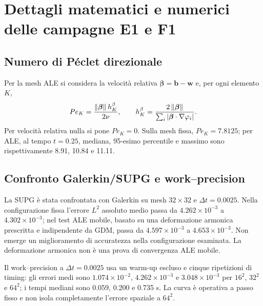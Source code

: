 \section{Dettagli matematici e numerici delle campagne E1 e F1}
\label{app:stageef}\label{app:solver_supplement}

\subsection{Numero di Péclet direzionale}

Per la mesh ALE si considera la velocità relativa $\boldsymbol\beta=\bm b-\bm w$ e, per ogni elemento $K$,
\begin{equation}
Pe_K=\frac{\left\lVert \boldsymbol\beta \right\rVert h_K^\beta}{2\nu},\qquad
h_K^\beta=\frac{2\left\lVert \boldsymbol\beta \right\rVert}{\sum_i|\boldsymbol\beta\cdot\nabla\varphi_i|}.
\label{eq:peclet_local}
\end{equation}
Per velocità relativa nulla si pone $Pe_K=0$. Sulla mesh fissa, $Pe_K=7.8125$; per ALE, al tempo $t=0.25$, mediana, 95-esimo percentile e massimo sono rispettivamente 8.91, 10.84 e 11.11.


\subsection{Confronto Galerkin/SUPG e work--precision}

La SUPG è stata confrontata con Galerkin su mesh $32\times32$ e $\Delta t=0.0025$. Nella configurazione fissa l'errore $L^2$ assoluto medio passa da $4.262\times10^{-3}$ a $4.302\times10^{-3}$; nel test ALE mobile, basato su una deformazione armonica prescritta e indipendente da GDM, passa da $4.597\times10^{-3}$ a $4.653\times10^{-3}$. Non emerge un miglioramento di accuratezza nella configurazione esaminata. La deformazione armonica non è una prova di convergenza ALE mobile.


Il work--precision a $\Delta t=0.0025$ usa un warm-up escluso e cinque ripetizioni di timing: gli errori medi sono $1.074\times10^{-2}$, $4.262\times10^{-3}$ e $3.048\times10^{-3}$ per $16^2$, $32^2$ e $64^2$; i tempi mediani sono 0.059, 0.200 e 0.735 s. La curva è operativa a passo fisso e non isola completamente l'errore spaziale a $64^2$.

